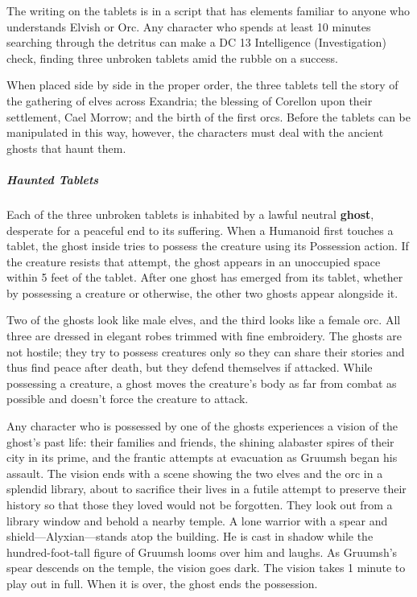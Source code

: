 \documentclass[10pt,a4paper,twoside,bg=print,twocolumn,openany,nodeprecatedcode]{dndbook}
\begin{document}
The writing on the tablets is in a script that has elements familiar to anyone who understands Elvish or Orc. Any character who spends at least 10 minutes searching through the detritus can make a DC 13 Intelligence (Investigation) check, finding three unbroken tablets amid the rubble on a success.

When placed side by side in the proper order, the three tablets tell the story of the gathering of elves across Exandria; the blessing of Corellon upon their settlement, Cael Morrow; and the birth of the first orcs. Before the tablets can be manipulated in this way, however, the characters must deal with the ancient ghosts that haunt them.

\subparagraph{Haunted Tablets}
Each of the three unbroken tablets is inhabited by a lawful neutral \textbf{ghost}, desperate for a peaceful end to its suffering. When a Humanoid first touches a tablet, the ghost inside tries to possess the creature using its Possession action. If the creature resists that attempt, the ghost appears in an unoccupied space within 5 feet of the tablet. After one ghost has emerged from its tablet, whether by possessing a creature or otherwise, the other two ghosts appear alongside it.

Two of the ghosts look like male elves, and the third looks like a female orc. All three are dressed in elegant robes trimmed with fine embroidery. The ghosts are not hostile; they try to possess creatures only so they can share their stories and thus find peace after death, but they defend themselves if attacked. While possessing a creature, a ghost moves the creature's body as far from combat as possible and doesn't force the creature to attack.

Any character who is possessed by one of the ghosts experiences a vision of the ghost's past life: their families and friends, the shining alabaster spires of their city in its prime, and the frantic attempts at evacuation as Gruumsh began his assault. The vision ends with a scene showing the two elves and the orc in a splendid library, about to sacrifice their lives in a futile attempt to preserve their history so that those they loved would not be forgotten. They look out from a library window and behold a nearby temple. A lone warrior with a spear and shield—Alyxian—stands atop the building. He is cast in shadow while the hundred-foot-tall figure of Gruumsh looms over him and laughs. As Gruumsh's spear descends on the temple, the vision goes dark. The vision takes 1 minute to play out in full. When it is over, the ghost ends the possession.
\end{document}
